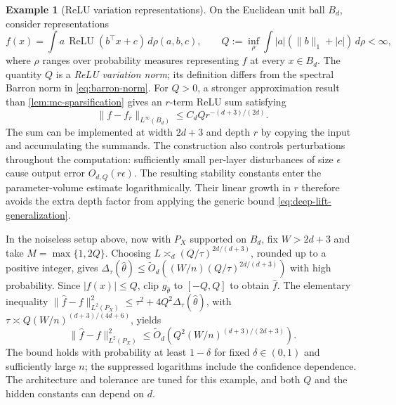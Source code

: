 \documentclass[11pt,twoside]{article}
\newcommand{\relu}{\operatorname{ReLU}}
\theoremstyle{definition}
\newtheorem{example}[theorem]{Example}
\theoremstyle{remark}
\begin{document}
\begin{example}[ReLU variation representations]
\label{ex:deep-lift-barron}
On the Euclidean unit ball $B_d$, consider representations
\begin{equation}
 f(x)=\int a\,\relu(b^\top x+c)\,d\rho(a,b,c),\qquad
 Q:=\inf_\rho\int |a|(\|b\|_1+|c|)\,d\rho<\infty,
 \label{eq:relu-barron-lift-norm}
\end{equation}
where $\rho$ ranges over probability measures representing $f$ at every
$x\in B_d$. The quantity $Q$ is a \emph{ReLU variation norm}; its definition
differs from the spectral Barron norm in \cref{eq:barron-norm}.
For $Q>0$, a stronger approximation result than
\cref{lem:mc-sparsification} gives an $r$-term ReLU sum satisfying
\begin{equation}
 \|f-f_r\|_{L^\infty(B_d)}\leq C_d Qr^{-(d+3)/(2d)}.
 \label{eq:relu-barron-uniform-rate}
\end{equation}
The sum can be implemented at width $2d+3$ and depth $r$ by copying the
input and accumulating the summands. The construction also controls
perturbations throughout the computation: sufficiently small per-layer
disturbances of size $\epsilon$ cause output error $O_{d,Q}(r\epsilon)$.
The resulting stability constants enter the parameter-volume estimate
logarithmically. Their linear growth in $r$ therefore avoids the extra depth
factor from applying the generic bound \cref{eq:deep-lift-generalization}.

In the noiseless setup above, now with $P_X$ supported on $B_d$, fix
$W>2d+3$ and take $M=\max\{1,2Q\}$. Choosing
$L\asymp_d(Q/\tau)^{2d/(d+3)}$, rounded up to a positive integer, gives
$\Delta_\tau(\widehat\theta)\leq
\widetilde O_d((W/n)(Q/\tau)^{2d/(d+3)})$ with high probability.
Since $|f(x)|\leq Q$, clip $g_{\widehat\theta}$ to $[-Q,Q]$ to obtain
$\widehat f$. The elementary inequality
$\|\widehat f-f\|_{L^2(P_X)}^2\leq
\tau^2+4Q^2\Delta_\tau(\widehat\theta)$, with
$\tau\asymp Q(W/n)^{(d+3)/(4d+6)}$, yields
\begin{equation}
 \|\widehat f-f\|_{L^2(P_X)}^2
 \leq\widetilde O_d\!\left(Q^2(W/n)^{(d+3)/(2d+3)}\right).
 \label{eq:deep-lift-barron-rate}
\end{equation}
The bound holds with probability at least $1-\delta$ for fixed
$\delta\in(0,1)$ and sufficiently large $n$; the suppressed logarithms
include the confidence dependence. The architecture and tolerance are tuned
for this example, and both $Q$ and the hidden constants can depend on $d$.
\end{example}
\end{document}
